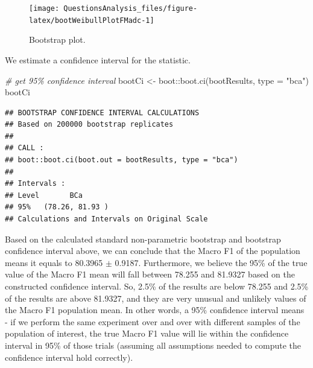 \documentclass[
]{article}
\newenvironment{Shaded}{\begin{snugshade}}{\end{snugshade}}
\newcommand{\AttributeTok}[1]{\textcolor[rgb]{0.77,0.63,0.00}{#1}}
\newcommand{\CommentTok}[1]{\textcolor[rgb]{0.56,0.35,0.01}{\textit{#1}}}
\newcommand{\FunctionTok}[1]{\textcolor[rgb]{0.00,0.00,0.00}{#1}}
\newcommand{\NormalTok}[1]{#1}
\newcommand{\OtherTok}[1]{\textcolor[rgb]{0.56,0.35,0.01}{#1}}
\newcommand{\SpecialCharTok}[1]{\textcolor[rgb]{0.00,0.00,0.00}{#1}}
\newcommand{\StringTok}[1]{\textcolor[rgb]{0.31,0.60,0.02}{#1}}
\begin{document}
\begin{Shaded}
\end{Shaded}

\begin{figure}

{\centering \texttt{[image: QuestionsAnalysis\_files/figure-latex/bootWeibullPlotFMadc-1]} 

}

\caption{Bootstrap plot.}\label{fig:bootWeibullPlotFMadc}
\end{figure}

We estimate a confidence interval for the statistic.

\begin{Shaded}
\begin{Highlighting}[]
\CommentTok{\# get 95\% confidence interval}
\NormalTok{bootCi }\OtherTok{\textless{}{-}}\NormalTok{ boot}\SpecialCharTok{::}\FunctionTok{boot.ci}\NormalTok{(bootResults, }\AttributeTok{type =} \StringTok{"bca"}\NormalTok{)}
\NormalTok{bootCi}
\end{Highlighting}
\end{Shaded}

\begin{verbatim}
## BOOTSTRAP CONFIDENCE INTERVAL CALCULATIONS
## Based on 200000 bootstrap replicates
## 
## CALL : 
## boot::boot.ci(boot.out = bootResults, type = "bca")
## 
## Intervals : 
## Level       BCa          
## 95%   (78.26, 81.93 )  
## Calculations and Intervals on Original Scale
\end{verbatim}

Based on the calculated standard non-parametric bootstrap and bootstrap confidence interval above, we can conclude that the Macro F1 of the population means it equals to 80.3965 \(\pm\) 0.9187. Furthermore, we believe the 95\% of the true value of the Macro F1 mean will fall between 78.255 and 81.9327 based on the constructed confidence interval. So, 2.5\% of the results are below 78.255 and 2.5\% of the results are above 81.9327, and they are very unusual and unlikely values of the Macro F1 population mean. In other words, a 95\% confidence interval means - if we perform the same experiment over and over with different samples of the population of interest, the true Macro F1 value will lie within the confidence interval in 95\% of those trials (assuming all assumptions needed to compute the confidence interval hold correctly).
\end{document}
